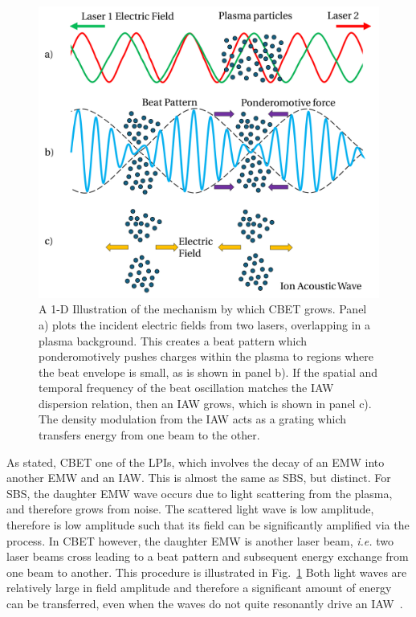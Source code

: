 \begin{figure}[t!]
    \includegraphics[width=0.8\linewidth]{Theory/Images/CBET_mechanism.png}
    \centering
    \caption{A 1-D Illustration of the mechanism by which \ac{CBET} grows.
    Panel a) plots the incident electric fields from two lasers, overlapping in a plasma background.
    This creates a beat pattern which ponderomotively pushes charges within the plasma to regions where the beat envelope is small, as is shown in panel b).
    If the spatial and temporal frequency of the beat oscillation matches the \ac{IAW} dispersion relation, then an \ac{IAW} grows, which is shown in panel c).
    The density modulation from the \ac{IAW} acts as a grating which transfers energy from one beam to the other.
    }%
    \label{fig:theory_CBET_mechanism}
\end{figure}

As stated, \ac{CBET} one of the \ac{LPIs}, which involves the decay of an \ac{EMW} into another \ac{EMW} and an \ac{IAW}.
This is almost the same as \ac{SBS}, but distinct.
For \ac{SBS}, the daughter \ac{EMW} wave occurs due to light scattering from the plasma, and therefore grows from noise.
The scattered light wave is low amplitude, therefore is low amplitude such that its field can be significantly amplified via the process.
In \ac{CBET} however, the daughter \ac{EMW} is another laser beam, \textit{i.e.} two laser beams cross leading to a beat pattern and subsequent energy exchange from one beam to another.
This procedure is illustrated in Fig.~\ref{fig:theory_CBET_mechanism}
Both light waves are relatively large in field amplitude and therefore a significant amount of energy can be transferred, even when the waves do not quite resonantly drive an \ac{IAW}~\cite{michel_introduction_2023}.

